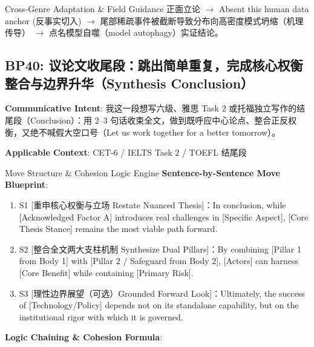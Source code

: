 \endgroup
\vspace{4pt}
\begin{TipBox}{Cross-Genre Adaptation \& Field Guidance}
正面立论 $\to$ Absent this human data anchor (反事实切入) $\to$ 尾部稀疏事件被截断导致分布向高密度模式坍缩（机理传导） $\to$ 点名模型自噬（model autophagy）实证结论。
\end{TipBox}
\vspace{8pt}
\subsection{BP40: 议论文收尾段：跳出简单重复，完成核心权衡整合与边界升华（Synthesis Conclusion）}\label{sec:bp:BP40}
\noindent\textbf{\color{AcadNavy}Communicative Intent}: 我这一段想写六级、雅思 Task 2 或托福独立写作的结尾段（Conclusion）：用 2--3 句话收束全文，做到既呼应中心论点、整合正反权衡，又绝不喊假大空口号（Let us work together for a better tomorrow）。\par\vspace{2pt}
\noindent\textbf{\color{AcadSlate}Applicable Context}: CET-6 / IELTS Task 2 / TOEFL 结尾段\par\vspace{4pt}
\begin{ConceptBox}{Move Structure \& Cohesion Logic Engine}
\textbf{Sentence-by-Sentence Move Blueprint}:
\begin{enumerate}[label=\textbf{\color{AcadNavy}S\arabic*.}, leftmargin=2em, itemsep=2pt]
  \item S1 [重申核心权衡与立场 Restate Nuanced Thesis]：In conclusion, while [Acknowledged Factor A] introduces real challenges in [Specific Aspect], [Core Thesis Stance] remains the most viable path forward.
  \item S2 [整合全文两大支柱机制 Synthesize Dual Pillars]：By combining [Pillar 1 from Body 1] with [Pillar 2 / Safeguard from Body 2], [Actors] can harness [Core Benefit] while containing [Primary Risk].
  \item S3 [理性边界展望（可选）Grounded Forward Look]：Ultimately, the success of [Technology/Policy] depends not on its standalone capability, but on the institutional rigor with which it is governed.
\end{enumerate}\par\vspace{4pt}
\textbf{Logic Chaining \& Cohesion Formula}:\par{}
\end{ConceptBox}
